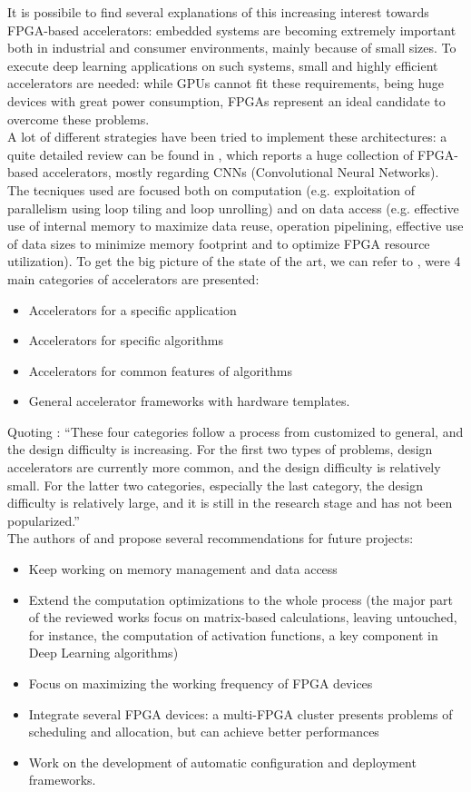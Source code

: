 \documentclass[11pt,a4paper]{article}
\begin{document}
It is possibile to find several explanations of this increasing interest towards FPGA-based accelerators: embedded systems are becoming extremely important both in industrial and consumer environments, mainly because of small sizes. To execute deep learning applications on such systems, small and highly efficient accelerators are needed: while GPUs cannot fit these requirements, being huge devices with great power consumption, FPGAs represent an ideal candidate to overcome these problems.
\\A lot of different strategies have been tried to implement these architectures: a quite detailed review can be found in \cite{shawahna_review_2019}, which reports a huge collection of FPGA-based accelerators, mostly regarding CNNs (Convolutional Neural Networks). The tecniques used are focused both on computation (e.g. exploitation of parallelism using loop tiling and loop unrolling) and on data access (e.g. effective use of internal memory to maximize data reuse, operation pipelining, effective use of data sizes to minimize memory footprint and to optimize FPGA resource utilization). To get the big picture of the state of the art, we can refer to \cite{wang_survey_2018}, were 4 main categories of accelerators are presented:
\begin{itemize}
    \item Accelerators for a specific application
    \item Accelerators for specific algorithms
    \item Accelerators for common features of algorithms
    \item General accelerator frameworks with hardware templates.
\end{itemize}
Quoting \cite{wang_survey_2018}: ``These four categories follow a process from customized to general, and the design difficulty is increasing. For the first two types of problems, design accelerators are currently more common, and the design difficulty is relatively small. For the latter two categories, especially the last category, the design difficulty is relatively large, and it is still in the research stage and has not been
popularized.''\\
The authors of \cite{wang_survey_2018} and \cite{shawahna_review_2019} propose several recommendations for future projects:
\begin{itemize}
    \item Keep working on memory management and data access
    \item Extend the computation optimizations to the whole process (the major part of the reviewed works focus on matrix-based calculations, leaving untouched, for instance, the computation of activation functions, a key component in Deep Learning algorithms)
    \item Focus on maximizing the working frequency of FPGA devices
    \item Integrate several FPGA devices: a multi-FPGA cluster presents problems of scheduling and allocation, but can achieve better performances
    \item Work on the development of automatic configuration and deployment frameworks.
\end{itemize}
\end{document}
